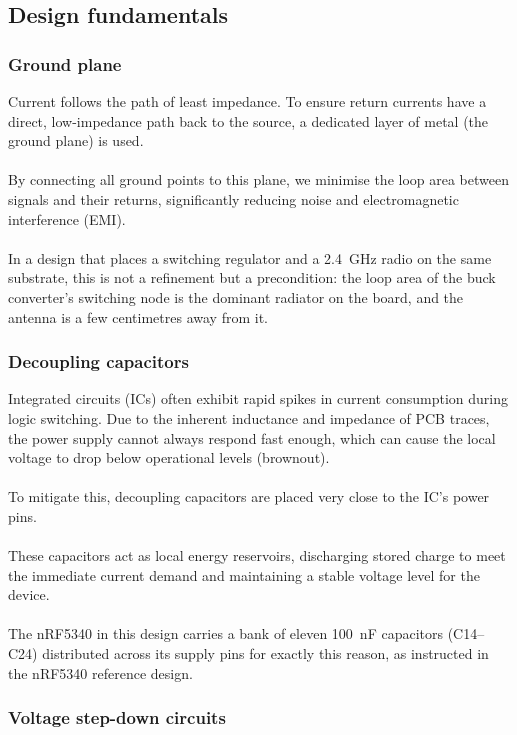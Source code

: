 \documentclass[12pt, a4paper]{article}
\begin{document}
\subsection{Design fundamentals}

\subsubsection{Ground plane}
Current follows the path of least impedance. To ensure return currents have a
direct, low-impedance path back to the source, a dedicated layer of metal (the
ground plane) is used.\\\\
By connecting all ground points to this plane, we
minimise the loop area between signals and their returns, significantly reducing
noise and electromagnetic interference (EMI).\\\\
In a design that places a
switching regulator and a \SI{2.4}{\giga\hertz} radio on the same substrate,
this is not a refinement but a precondition: the loop area of the buck
converter's switching node is the dominant radiator on the board, and the
antenna is a few centimetres away from it.

\subsubsection{Decoupling capacitors}
\label{fund:decoupling_capacitors}
Integrated circuits (ICs) often exhibit rapid spikes in current consumption
during logic switching. Due to the inherent inductance and impedance of PCB
traces, the power supply cannot always respond fast enough, which can cause the
local voltage to drop below operational levels (brownout).\\\\
To mitigate this, decoupling capacitors are placed very close to the IC's power pins.\\\\
These capacitors act as local energy reservoirs, discharging stored charge to meet the
immediate current demand and maintaining a stable voltage level for the device.\\\\
The nRF5340 in this design carries a bank of eleven \SI{100}{\nano\farad}
capacitors (C14--C24) distributed across its supply pins for exactly this
reason, as instructed in the nRF5340 reference design.

\subsubsection{Voltage step-down circuits}
\end{document}
